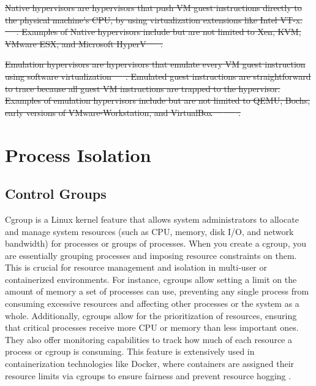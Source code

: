 \documentclass[12pt]{report}
\providecommand{\DIFdeltex}[1]{{\protect\color{red}\sout{#1}}}                      %
\providecommand{\DIFdelend}{} %
\providecommand{\DIFdel}[1]{\texorpdfstring{\DIFdeltex{#1}}{}} %
\DeclareRobustCommand{\DIFdelend}{\DIFOaddend \let\includegraphics\DIFOincludegraphics} %
\begin{document}
\begin{doublespace}
\DIFdel{Native hypervisors are hypervisors that push VM guest instructions directly to the physical machine's CPU, by using virtualization extensions like Intel VT-x. ~\mbox{%
\cite{10.1145/2775111}}\hskip0pt%
. Examples of Native hypervisors include but are not limited to Xen, KVM, VMware ESX, and Microsoft HyperV ~\mbox{%
\cite{patel2025hypervisor}}\hskip0pt%
.
}%

\DIFdel{Emulation hypervisors are hypervisors that emulate every VM guest instruction using software virtualization ~\mbox{%
\cite{10.1145/2775111}}\hskip0pt%
. Emulated guest instructions are straightforward to trace because all guest VM instructions are trapped to the hypervisor. Examples of emulation hypervisors include but are not limited to QEMU, Bochs, early versions of VMware-Workstation, and VirtualBox ~\mbox{%
\cite{10.1145/2775111}}\hskip0pt%
~\mbox{%
\cite{patel2025hypervisor}}\hskip0pt%
.
}\DIFdelend 

\section{Process Isolation}

\subsection{Control Groups}
Cgroup is a Linux kernel feature that allows system administrators to allocate and manage system resources (such as CPU, memory, disk I/O, and network bandwidth) for processes or groups of processes. When you create a cgroup, you are essentially grouping processes and imposing resource constraints on them. This is crucial for resource management and isolation in multi-user or containerized environments. For instance, cgroups allow setting a limit on the amount of memory a set of processes can use, preventing any single process from consuming excessive resources and affecting other processes or the system as a whole. Additionally, cgroups allow for the prioritization of resources, ensuring that critical processes receive more CPU or memory than less important ones. They also offer monitoring capabilities to track how much of each resource a process or cgroup is consuming. This feature is extensively used in containerization technologies like Docker, where containers are assigned their resource limits via cgroups to ensure fairness and prevent resource hogging \cite{brown2014cgroups}.


\end{doublespace}
\end{document}
